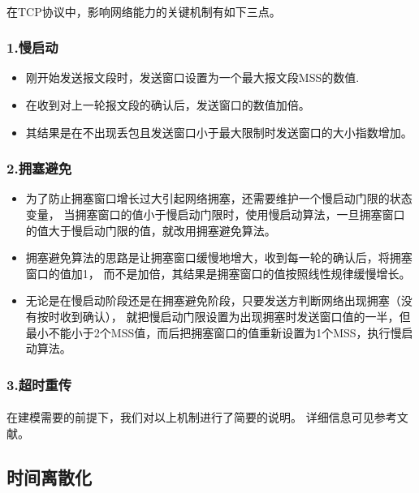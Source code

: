\documentclass[UTF8]{ctexart}
\begin{document}
\paragraph{}
在TCP协议中，影响网络能力的关键机制有如下三点。
\subsubsection{1.慢启动}
\begin{itemize}
    \item 刚开始发送报文段时，发送窗口设置为一个最大报文段MSS的数值.
    \item 在收到对上一轮报文段的确认后，发送窗口的数值加倍。
    \item 其结果是在不出现丢包且发送窗口小于最大限制时发送窗口的大小指数增加。
\end{itemize}
\subsubsection{2.拥塞避免}
\begin{itemize}
    \item 为了防止拥塞窗口增长过大引起网络拥塞，还需要维护一个慢启动门限的状态变量，
    当拥塞窗口的值小于慢启动门限时，使用慢启动算法，一旦拥塞窗口的值大于慢启动门限的值，就改用拥塞避免算法。

    \item 拥塞避免算法的思路是让拥塞窗口缓慢地增大，收到每一轮的确认后，将拥塞窗口的值加1，
    而不是加倍，其结果是拥塞窗口的值按照线性规律缓慢增长。

    \item 无论是在慢启动阶段还是在拥塞避免阶段，只要发送方判断网络出现拥塞（没有按时收到确认），
    就把慢启动门限设置为出现拥塞时发送窗口值的一半，但最小不能小于2个MSS值，而后把拥塞窗口的值重新设置为1个MSS，执行慢启动算法。
\end{itemize}
\subsubsection{3.超时重传}


\paragraph{}
在建模需要的前提下，我们对以上机制进行了简要的说明。
详细信息可见参考文献\cite{}\cite{}。

\subsection{时间离散化}
\end{document}
